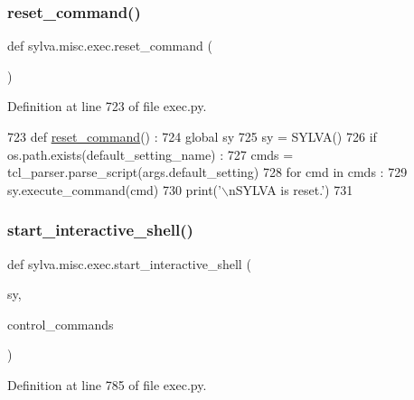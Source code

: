\subsubsection{\texorpdfstring{reset\+\_\+command()}{reset\_command()}}
{\footnotesize\ttfamily def sylva.\+misc.\+exec.\+reset\+\_\+command (\begin{DoxyParamCaption}{ }\end{DoxyParamCaption})}



Definition at line 723 of file exec.\+py.


\begin{DoxyCode}
723 \textcolor{keyword}{def }\hyperlink{namespacesylva_1_1misc_1_1exec_a670ec00a77a111ff274f7d3dc3989966}{reset\_command}() :
724   \textcolor{keyword}{global} sy
725   sy = SYLVA()
726   \textcolor{keywordflow}{if} os.path.exists(default\_setting\_name) :
727     cmds = tcl\_parser.parse\_script(args.default\_setting)
728     \textcolor{keywordflow}{for} cmd \textcolor{keywordflow}{in} cmds :
729       sy.execute\_command(cmd)
730   print(\textcolor{stringliteral}{'\(\backslash\)nSYLVA is reset.'})
731 
\end{DoxyCode}
\mbox{\label{namespacesylva_1_1misc_1_1exec_a75779a3eb47b91a0f69020b264c0bd2d}} 
\subsubsection{\texorpdfstring{start\+\_\+interactive\+\_\+shell()}{start\_interactive\_shell()}}
{\footnotesize\ttfamily def sylva.\+misc.\+exec.\+start\+\_\+interactive\+\_\+shell (\begin{DoxyParamCaption}\item[{}]{sy,  }\item[{}]{control\+\_\+commands }\end{DoxyParamCaption})}



Definition at line 785 of file exec.\+py.


